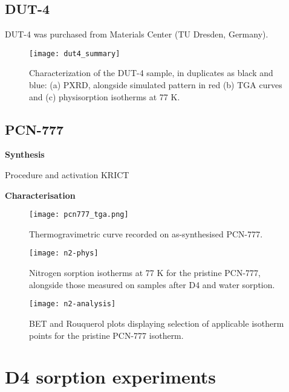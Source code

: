 \subsection{DUT-4}

DUT-4 was purchased from Materials Center (TU Dresden, Germany).

\begin{figure}[H]
    \centering
    \texttt{[image: dut4\_summary]}
    \caption{%
        Characterization of the DUT-4 sample, in duplicates as black
        and blue: (a) PXRD, alongside simulated pattern in red (b) TGA curves
        and (c)  physisorption isotherms at 77 K.
    }\label{fig:dut4-summary}
\end{figure}

\subsection{PCN-777}

\textbf{Synthesis}

Procedure and activation KRICT

\textbf{Characterisation}

\begin{figure}[H]
    \centering
    \texttt{[image: pcn777\_tga.png]}
    \caption{%
        Thermogravimetric curve recorded on as-synthesised PCN-777.
    }\label{fig:tga}
\end{figure}

\begin{figure}[H]
    \centering
    \texttt{[image: n2-phys]}
    \caption{%
        Nitrogen sorption isotherms at 77 K for the pristine
        PCN-777, alongside those measured on samples after D4 and water
        sorption.
    }\label{fig:n2-phys}
\end{figure}


\begin{figure}[H]
    \centering
    \texttt{[image: n2-analysis]}
    \caption{%
        BET and Rouquerol plots displaying selection of applicable
        isotherm points for the pristine PCN-777 isotherm.
    }\label{fig:n2-analysis}
\end{figure}

\pagebreak


\section{D4 sorption experiments}\label{d4-sorption-experiments}

